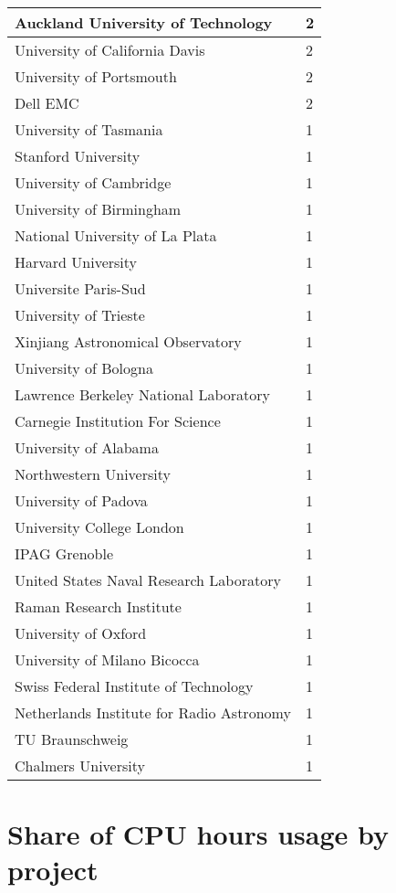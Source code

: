\documentclass{article}%
\begin{document}
\begin{longtabu}{X[l] X[r]}
\hline%
Auckland University of Technology&2\\%
\hline%
University of California Davis&2\\%
\hline%
University of Portsmouth&2\\%
\hline%
Dell EMC&2\\%
\hline%
University of Tasmania&1\\%
\hline%
Stanford University&1\\%
\hline%
University of Cambridge&1\\%
\hline%
University of Birmingham&1\\%
\hline%
National University of La Plata&1\\%
\hline%
Harvard University&1\\%
\hline%
Universite Paris{-}Sud&1\\%
\hline%
University of Trieste&1\\%
\hline%
Xinjiang Astronomical Observatory&1\\%
\hline%
University of Bologna&1\\%
\hline%
Lawrence Berkeley National Laboratory&1\\%
\hline%
Carnegie Institution For Science&1\\%
\hline%
University of Alabama&1\\%
\hline%
Northwestern University&1\\%
\hline%
University of Padova&1\\%
\hline%
University College London&1\\%
\hline%
IPAG Grenoble&1\\%
\hline%
United States Naval Research Laboratory&1\\%
\hline%
Raman Research Institute&1\\%
\hline%
University of Oxford&1\\%
\hline%
University of Milano Bicocca&1\\%
\hline%
Swiss Federal Institute of Technology&1\\%
\hline%
Netherlands Institute for Radio Astronomy&1\\%
\hline%
TU Braunschweig&1\\%
\hline%
Chalmers University&1\\%
\hline%
\end{longtabu}%
\section{Share of CPU hours usage by project}%
\end{document}
